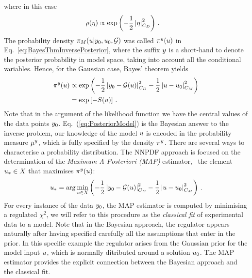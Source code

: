 where in this case 
\begin{align}
  \label{eq:RhoGauss}
  \rho(\eta) &\propto \exp\left(
               -\frac12 \left|\eta\right|_{C_{D}}^2
               \right)\, .
\end{align}
The probability density $\pi_M(u|y_0,u_0,\mathcal{G})$ was called $\pi^y(u)$ in
Eq.~\ref{eq:BayesThmInversePosterior}, where the suffix $y$ is a short-hand to
denote the posterior probability in model space, taking into account all the
conditional variables. Hence, for the Gaussian case, Bayes' theorem yields
\begin{align}
  \label{eq:PosteriorModel}
  \pi^y(u) &\propto 
  \exp\left(
  -\frac12 \left| y_0 - \mathcal{G}(u) \right|_{C_{D}}^2
  -\frac12 \left| u - u_0 \right|_{C_M}^2
  \right)\\ 
  &= \exp\left[
    - S(u)
  \right]\, .
\end{align}
Note that in the argument of the likelihood function we have the central values
of the data points $y_0$. Eq.~(\ref{eq:PosteriorModel}) is the Bayesian answer
to the inverse problem, our knowledge of the model $u$ is encoded in the
probability measure $\mu^y$, which is fully specified by the density $\pi^y$.
There are several ways to characterise a probability distribution. The NNPDF
approach is focused on the determination of the {\em Maximum A Posteriori (MAP)}
estimator, \ie\ the element $u_* \in X$ that maximises $\pi^y(u)$:
\begin{align}\label{eq:MAP}
  u_* = \arg\min_{u \in X} 
  \left(
  -\frac12 \left| y_0 - \mathcal{G}(u) \right|_{C_{D}}^2
  -\frac12 \left| u - u_0 \right|_{C_M}^2
  \right)\, .
\end{align}
For every instance of the data $y_0$, the MAP estimator is computed by
minimising a regulated $\chi^2$, we will refer to this procedure as the {\em
classical fit} of experimental data to a model. Note that in the Bayesian
approach, the regulator appears naturally after having specified carefully all
the assumptions that enter in the prior. In this specific example the regulator
arises from the Gaussian prior for the model input $u$, which is normally
ditributed around a solution $u_0$. The MAP estimator provides the explicit
connection between the Bayesian approach and the classical fit.


